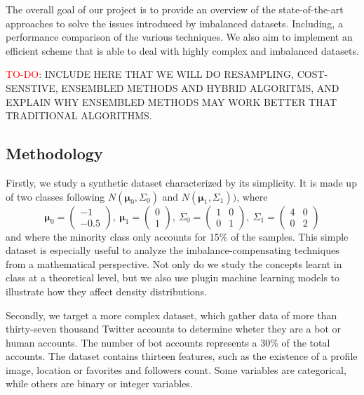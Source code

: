 \documentclass[conference]{IEEEtran}
\begin{document}
	The overall goal of our project is to provide an overview of the state-of-the-art approaches to solve the issues introduced by imbalanced datasets. Including, a performance comparison of the various techniques. We also aim to implement an efficient scheme that is able to deal with highly complex and imbalanced datasets.
	
	\textcolor{red}{TO-DO}: INCLUDE HERE THAT WE WILL DO RESAMPLING, COST-SENSTIVE, ENSEMBLED METHODS AND HYBRID ALGORITMS, AND EXPLAIN WHY ENSEMBLED METHODS MAY WORK BETTER THAT TRADITIONAL ALGORITHMS. 


	\subsection{Methodology}
	Firstly, we study a synthetic dataset characterized by its simplicity. It is made up of two classes following $N(\boldsymbol\mu_0, \Sigma_0)$ and $N(\boldsymbol\mu_1, \Sigma_1))$, where
			\begin{equation*}
				\boldsymbol\mu_0=
				\begin{pmatrix}
					-1\\
					-0.5
				\end{pmatrix},\ %
				\boldsymbol\mu_1=
				\begin{pmatrix}
					0\\
					1
				\end{pmatrix},\ %
				\Sigma_0=
				\begin{pmatrix}
					1 & 0\\
					0 & 1
				\end{pmatrix},\ %
				\Sigma_1=
				\begin{pmatrix}
					4 & 0\\
					0 & 2
				\end{pmatrix}
			\end{equation*} and where the minority class only accounts for 15\% of the samples. This simple dataset is especially useful to analyze the imbalance-compensating techniques from a mathematical perspective. Not only do we study the concepts learnt in class at a theoretical level, but we also use plugin machine learning models to illustrate how they affect density distributions.

		Secondly, we target a more complex dataset, which gather data of more than thirty-seven thousand Twitter accounts to determine wheter they are a bot or human accounts. The number of bot accounts represents a 30\% of the total accounts. The dataset contains thirteen features, such as the existence of a profile image, location or favorites and followers count. Some variables are categorical, while others are binary or integer variables. 
\end{document}
